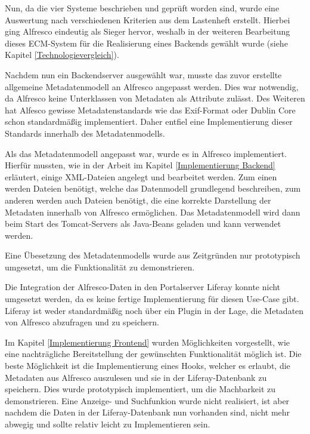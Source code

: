 Nun, da die vier Systeme beschrieben und gepr\"uft worden sind, wurde eine Auswertung nach verschiedenen Kriterien aus dem Lastenheft erstellt. Hierbei ging Alfresco eindeutig als Sieger hervor, weshalb in der weiteren Bearbeitung dieses ECM-System f\"ur die Realisierung eines Backends gew\"ahlt wurde (siehe Kapitel \ref{Technologievergleich}).

Nachdem nun ein Backendserver ausgew\"ahlt war, musste das zuvor erstellte allgemeine Metadatenmodell an Alfresco angepasst werden. Dies war notwendig, da Alfresco keine Unterklassen von Metadaten als Attribute zul\"asst. Des Weiteren hat Alfesco gewisse Metadatenstandards wie das \ac{Exif}-Format oder Dublin Core schon standardm\"a\ss{}ig implementiert. Daher entfiel eine Implementierung dieser Standards innerhalb des Metadatenmodells.

Als das Metadatenmodell angepasst war, wurde es in Alfresco implementiert. Hierf\"ur mussten, wie in der Arbeit im Kapitel \ref{Implementierung Backend} erl\"autert, einige XML-Dateien angelegt und bearbeitet werden. Zum einen werden Dateien ben\"otigt, welche das Datenmodell grundlegend beschreiben, zum anderen werden auch Dateien ben\"otigt, die eine korrekte Darstellung der Metadaten innerhalb von Alfresco erm\"oglichen. 
Das Metadatenmodell wird dann beim Start des Tomcat-Servers als Java-Beans geladen und kann verwendet werden.

Eine \"Ubesetzung des Metadatenmodells wurde aus Zeitgr\"unden nur prototypisch umgesetzt, um die Funktionalit\"at zu demonstrieren. 

Die Integration der Alfresco-Daten in den Portalserver Liferay konnte nicht umgesetzt werden, da es keine fertige Implementierung f\"ur diesen Use-Case gibt. Liferay ist weder standardm\"a\ss{}ig noch \"uber ein Plugin in der Lage, die Metadaten von Alfresco abzufragen und zu speichern.

Im Kapitel \ref{Implementierung Frontend} wurden M\"oglichkeiten vorgestellt, wie eine nachtr\"agliche Bereitstellung der gew\"unschten Funktionalit\"at m\"oglich ist. Die beste M\"oglichkeit ist die Implementierung eines Hooks, welcher es erlaubt, die Metadaten aus Alfresco auszulesen und sie in der Liferay-Datenbank zu speichern. Dies wurde prototypisch implementiert, um die Machbarkeit zu demonstrieren. Eine Anzeige- und Suchfunkion wurde nicht realisiert, ist aber nachdem die Daten in der Liferay-Datenbank nun vorhanden sind, nicht mehr abwegig und sollte relativ leicht zu Implementieren sein.

